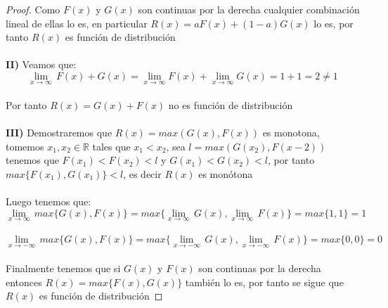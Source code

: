 \documentclass[11pt,letterpaper]{article}
\newcommand{\R}{\mathbb{R}}
\begin{document}
\begin{proof}
  Como $F(x)$ y $G(x)$ son continuas por la derecha cualquier combinaci\'on lineal de ellas lo es, en particular $R(x)=aF(x)+(1-a)G(x)$ lo es, por tanto $R(x)$ es
  funci\'on de distribuci\'on\,\\
  \,\\
  \textbf{II)}\,\,Veamos que:\,\\
  \begin{equation*}
    \lim_{x\rightarrow \infty}\,F(x)+G(x)=\lim_{x\rightarrow \infty}F(x)+\lim_{x\rightarrow \infty}G(x)=1+1=2\neq 1
  \end{equation*}\,\\
  Por tanto $R(x)=G(x)+F(x)$ no es funci\'on de distribuci\'on\,\\
  \,\\
  \textbf{III)}\,\,Demostraremos que $R(x)=max(G(x),F(x))$ es monotona, tomemos $x_1,x_2\in \R$ tales que $x_1<x_2$, sea $l=max(G(x_2),F(x-2))$ tenemos que $F(x_1)<F(x_2)<l$ y $G(x_1)<G(x_2)<l$, por tanto $max\{F(x_1),G(x_1)\}<l$, es decir 
  $R(x)$ es mon\'otona\,\\
  \,\\
  Luego tenemos que:\,\\
  \begin{equation*}
    \lim_{x\rightarrow \infty}\,max\{G(x),F(x)\}=max\{\lim_{x\rightarrow \infty}\,G(x),\lim_{x\rightarrow \infty}\,F(x)\}=max\{1,1\}=1
  \end{equation*}\,\\
    \begin{equation*}
    \lim_{x\rightarrow -\infty}\,max\{G(x),F(x)\}=max\{\lim_{x\rightarrow -\infty}\,G(x),\lim_{x\rightarrow -\infty}\,F(x)\}=max\{0,0\}=0
  \end{equation*}\,\\
  Finalmente tenemos que si $G(x)$ y $F(x)$ son continuas por la derecha entonces $R(x)=max\{F(x),G(x)\}$ tambi\'en lo es, por tanto
  se sigue que $R(x)$ es funci\'on de distribuci\'on
\end{proof}\,\\
\end{document}
